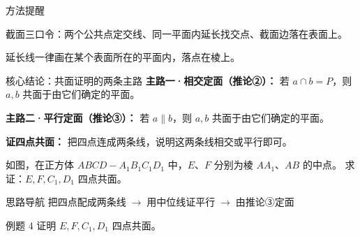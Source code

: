 \documentclass{exam-zh}
\begin{document}
\begin{eduSummaryBlock}{\eduIconPin}{方法提醒}
\begin{eduBulletList}
  \item 截面三口令：两个公共点定交线、同一平面内延长找交点、截面边落在表面上。  \item 延长线一律画在某个表面所在的平面内，落点在棱上。\end{eduBulletList}
\end{eduSummaryBlock}



\clearpage
{}


\begin{eduSolutionBox}{核心结论：共面证明的两条主路}
  \begingroup
  \setlength{\parskip}{2.5mm}
\textbf{主路一·相交定面（推论②）：} 若 $a\cap b=P$，则 $a,b$ 共面于由它们确定的平面。\par
\textbf{主路二·平行定面（推论③）：} 若 $a\parallel b$，则 $a,b$ 共面于由它们确定的平面。\par
\textbf{证四点共面：} 把四点连成两条线，说明这两条线相交或平行即可。\par
  \endgroup
\end{eduSolutionBox}




\begin{eduProblemBlock}[例题 4]
\noindent
\begin{minipage}[t]{\dimexpr\linewidth-70mm-6mm\relax}
\vspace{0pt}
如图，在正方体 $ABCD-A_1B_1C_1D_1$ 中，$E$、$F$ 分别为棱 $AA_1$、$AB$ 的中点。
求证：$E,F,C_1,D_1$ 四点共面。

\end{minipage}\hfill
\begin{diagramcoltikz}{70mm}{看清中点 $E,F$ 与 $C_1,D_1$。}
}
\end{diagramcoltikz}
\end{eduProblemBlock}





\begin{eduAuxItem}{思路导航}
把四点配成两条线$\;\to\;$用中位线证平行$\;\to\;$由推论③定面\end{eduAuxItem}




\begin{eduSubQuestionItem}{例题 4}
证明 $E,F,C_1,D_1$ 四点共面。\end{eduSubQuestionItem}
\end{document}
